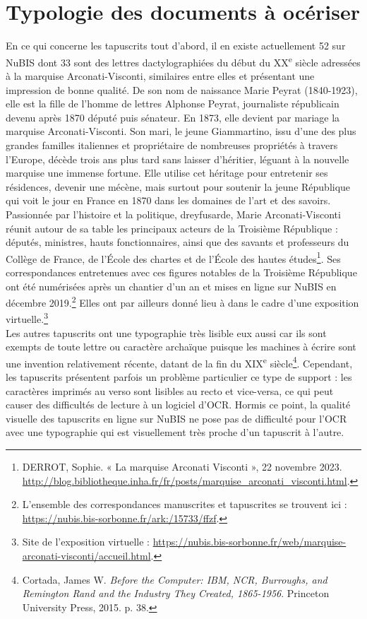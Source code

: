\documentclass[a4paper,12pt,twoside]{book}
\begin{document}
\section{Typologie des documents à océriser}

En ce qui concerne les tapuscrits tout d'abord, il en existe
actuellement 52 sur NuBIS dont 33 sont des lettres dactylographiées du
début du XX\textsuperscript{e} siècle adressées à la marquise
Arconati-Visconti, similaires entre elles et présentant une impression
de bonne qualité. De son nom de naissance Marie Peyrat (1840-1923), elle
est la fille de l'homme de lettres Alphonse Peyrat, journaliste
républicain devenu après 1870 député puis sénateur. En 1873, elle
devient par mariage la marquise Arconati-Visconti. Son mari, le jeune
Giammartino, issu d'une des plus grandes familles
italiennes et propriétaire de nombreuses propriétés à travers
l'Europe, décède trois ans plus tard sans laisser
d'héritier, léguant à la nouvelle marquise une immense
fortune. Elle utilise cet héritage pour entretenir ses résidences,
devenir une mécène, mais surtout pour soutenir la jeune République qui
voit le jour en France en 1870 dans les domaines de
l'art et des savoirs. Passionnée par
l'histoire et la politique, dreyfusarde, Marie
Arconati-Visconti réunit autour de sa table les principaux acteurs de la
Troisième République : députés, ministres, hauts fonctionnaires, ainsi
que des savants et professeurs du Collège de France, de
l'École des chartes et de l'École des
hautes études\footnote{DERROT, Sophie. « La marquise Arconati Visconti
	», 22 novembre 2023.
	\url{http://blog.bibliotheque.inha.fr/fr/posts/marquise_arconati_visconti.html}.}.
Ses correspondances entretenues avec ces figures notables de la
Troisième République ont été numérisées après un chantier d'un an et
mises en ligne sur NuBIS en décembre 2019.\footnote{L'ensemble des
	correspondances manuscrites et tapuscrites se trouvent ici :
	\url{https://nubis.bis-sorbonne.fr/ark:/15733/ffzf}.}
Elles ont par ailleurs donné lieu à dans le cadre d'une exposition
virtuelle.\footnote{Site de l'exposition virtuelle :
	\url{https://nubis.bis-sorbonne.fr/web/marquise-arconati-visconti/accueil.html}.} \\

Les autres tapuscrits ont une typographie très lisible eux aussi car ils sont
exempts de toute lettre ou caractère archaïque puisque les machines à
écrire sont une invention relativement récente, datant de la fin du
XIX\textsuperscript{e} siècle\footnote{Cortada, James W. \emph{Before
		the Computer: IBM, NCR, Burroughs, and Remington Rand and the Industry
		They Created, 1865-1956}. Princeton University Press, 2015. p. 38.}.
Cependant, les tapuscrits présentent parfois un problème particulier ce
type de support : les caractères imprimés au verso sont lisibles au
recto et vice-versa, ce qui peut causer des difficultés de lecture à un
logiciel d'OCR. Hormis ce point, la qualité visuelle des tapuscrits en
ligne sur NuBIS ne pose pas de difficulté pour l'OCR avec une
typographie qui est visuellement très proche d'un tapuscrit à l'autre. \\
\end{document}
